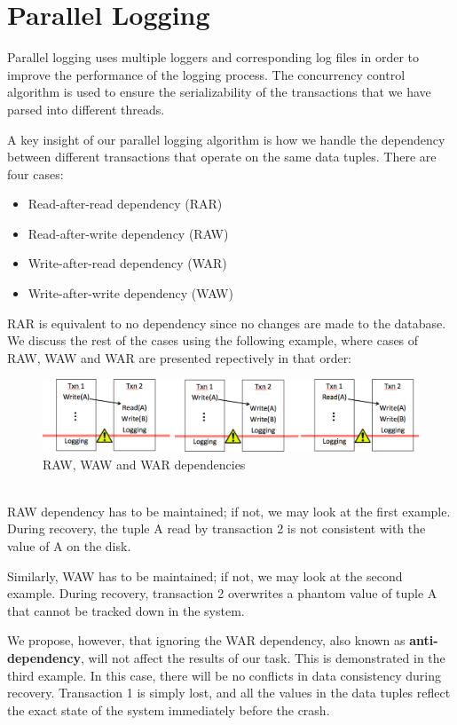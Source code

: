 \section{Parallel Logging}
Parallel logging uses multiple loggers and corresponding log files in order to improve the performance of the logging process. The concurrency control algorithm is used to ensure the serializability of the transactions that we have parsed into different threads. \par
A key insight of our parallel logging algorithm is how we handle the dependency between different transactions that operate on the same data tuples. There are four cases:
\begin{itemize}
\item Read-after-read dependency (RAR)
\item Read-after-write dependency (RAW)
\item Write-after-read dependency (WAR)
\item Write-after-write dependency (WAW)
\end{itemize}
RAR is equivalent to no dependency since no changes are made to the database. We discuss the rest of the cases using the following example, where cases of RAW, WAW and WAR are presented repectively in that order:
\begin{figure}[!h]
\caption{RAW, WAW and WAR dependencies}
\includegraphics[width=\textwidth]{Dependencies.jpg}
\end{figure}\\
RAW dependency has to be maintained; if not, we may look at the first example. During recovery, the tuple A read by transaction 2 is not consistent with the value of A on the disk. 

Similarly, WAW has to be maintained; if not, we may look at the second example. During recovery, transaction 2 overwrites a phantom value of tuple A that cannot be tracked down in the system. 

We propose, however, that ignoring the WAR dependency, also known as  \textbf{anti-dependency}, will not affect the results of our task. This is demonstrated in the third example. In this case, there will be no conflicts in data consistency during recovery. Transaction 1 is simply lost, and all the values in the data tuples reflect the exact state of the system immediately before the crash. \par

